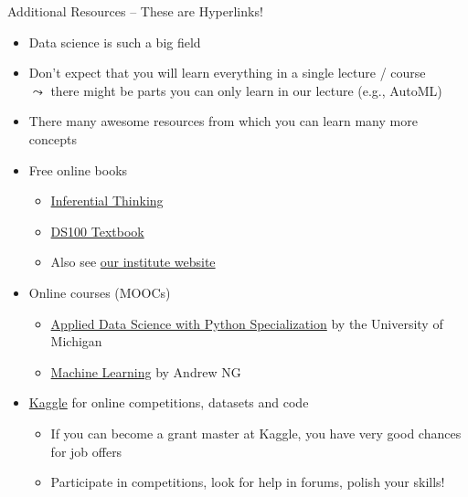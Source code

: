 \documentclass[aspectratio=169,handout]{../latex_main/tntbeamer}  %
\begin{document}
\begin{frame}[c]{Additional Resources -- These are Hyperlinks!}

\begin{itemize} 
  \item Data science is such a big field
  \item Don't expect that you will learn everything in a single lecture / course\\ $\leadsto$ there might be parts you can only learn in our lecture (e.g., AutoML)
  \item There many awesome resources from which you can learn many more concepts
  \pause
  \bigskip
  \item Free online books
  \begin{itemize}
    \item \href{https://inferentialthinking.com/chapters/intro.html}{Inferential Thinking}
      \item \href{https://www.textbook.ds100.org/intro.html}{DS100 Textbook}
      \item Also see \href{https://www.ai.uni-hannover.de/en/studies/recommended-literature}{our institute website}
\end{itemize}
  \pause
  \item Online courses (MOOCs)
  \begin{itemize}
      \item \href{https://www.coursera.org/specializations/data-science-python}{Applied Data Science with Python Specialization} by the University of Michigan
      \item \href{https://www.coursera.org/learn/machine-learning/home/welcome}{Machine Learning} by Andrew NG
  \end{itemize}
  \pause
  \item \href{https://www.kaggle.com/}{Kaggle} for online competitions, datasets and code
  \begin{itemize}
      \item If you can become a grant master at Kaggle, you have very good chances for job offers
      \item Participate in competitions, look for help in forums, polish your skills!
  \end{itemize}
\end{itemize}

\end{frame}
\end{document}
